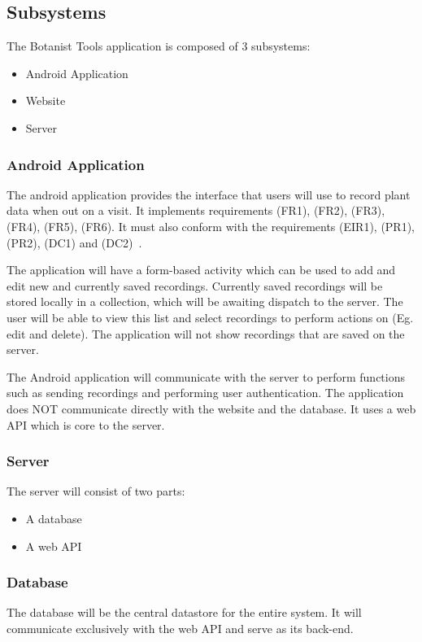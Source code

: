 \subsection{Subsystems}
	The Botanist Tools application is composed of 3 subsystems:
	\begin{itemize}
		\item Android Application
		\item Website
		\item Server
	\end{itemize}

	\subsubsection{Android Application}
		The android application provides the interface that users will use to record  plant data when out on a visit. It implements requirements (FR1), (FR2), (FR3), (FR4), (FR5), (FR6). It must also conform with the requirements (EIR1), (PR1),  (PR2), (DC1) and (DC2)~\cite{refSpec}.

		The application will have a form-based activity which can be used to add and edit new and currently saved recordings. Currently saved recordings will be stored locally in a collection, which will be awaiting dispatch to the server. The user will be able to view this list and select recordings to perform actions on (Eg. edit and delete). The application will not show recordings that are saved on the server. 

		The Android application will communicate with the server to perform functions such as sending recordings and performing user authentication. The application does NOT communicate directly with the website and the database. It uses a web API which is core to the server.

	\subsubsection{Server}

		The server will consist of two parts: 
		\begin{itemize}
			\item A database
			\item A web API
		\end{itemize}

	\subsubsection{Database}
		The database will be the central datastore for the entire system. It will communicate exclusively with the web API and serve as its back-end. 

